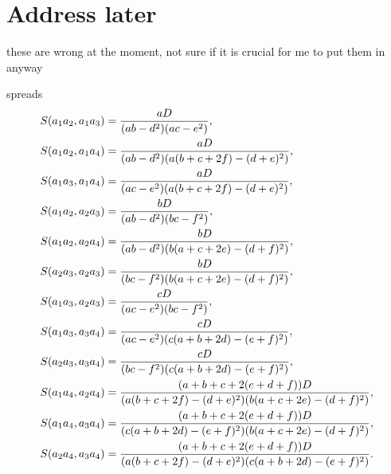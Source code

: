 \documentclass[11pt]{article}
\begin{document}
\section{Address later}

these are wrong at the moment, not sure if it is crucial for me to put them
in anyway

spreads 
\begin{align*}
S(a_{1}a_{2},a_{1}a_{3})& =\frac{aD}{(ab-d^{2})(ac-e^{2})}, \\
S(a_{1}a_{2},a_{1}a_{4})& =\frac{aD}{(ab-d^{2})(a(b+c+2f)-(d+e)^{2})}, \\
S(a_{1}a_{3},a_{1}a_{4})& =\frac{aD}{(ac-e^{2})(a(b+c+2f)-(d+e)^{2})}, \\
S(a_{1}a_{2},a_{2}a_{3})& =\frac{bD}{(ab-d^{2})(bc-f^{2})}, \\
S(a_{1}a_{2},a_{2}a_{4})& =\frac{bD}{(ab-d^{2})(b(a+c+2e)-(d+f)^{2})}, \\
S(a_{2}a_{3},a_{2}a_{3})& =\frac{bD}{(bc-f^{2})(b(a+c+2e)-(d+f)^{2})}, \\
S(a_{1}a_{3},a_{2}a_{3})& =\frac{cD}{(ac-e^{2})(bc-f^{2})}, \\
S(a_{1}a_{3},a_{3}a_{4})& =\frac{cD}{(ac-e^{2})(c(a+b+2d)-(e+f)^{2})}, \\
S(a_{2}a_{3},a_{3}a_{4})& =\frac{cD}{(bc-f^{2})(c(a+b+2d)-(e+f)^{2})}, \\
S(a_{1}a_{4},a_{2}a_{4})& =\frac{(a+b+c+2(e+d+f))D}{%
(a(b+c+2f)-(d+e)^{2})(b(a+c+2e)-(d+f)^{2})}, \\
S(a_{1}a_{4},a_{3}a_{4})& =\frac{(a+b+c+2(e+d+f))D}{%
(c(a+b+2d)-(e+f)^{2})(b(a+c+2e)-(d+f)^{2})}, \\
S(a_{2}a_{4},a_{3}a_{4})& =\frac{(a+b+c+2(e+d+f))D}{%
(a(b+c+2f)-(d+e)^{2})(c(a+b+2d)-(e+f)^{2})}.
\end{align*}
\end{document}
